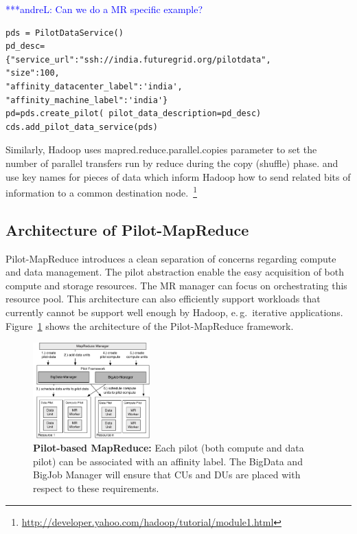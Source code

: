 \documentclass{acm_proc_article-sp}
\newcommand{\alnote}[1]{ {\textcolor{blue} { ***andreL: #1 }}}
\newcommand{\alnote}[1]{}
\newcommand{\pilotmapreduce}{Pilot-MapReduce\xspace}
\begin{document}
\alnote{Can we do a MR specific example?}

\lstset{
language=Python,
frame=single,
captionpos=b,
stringstyle=\ttfamily,
basicstyle=\scriptsize\ttfamily
}
\noindent\begin{minipage}{0.47 \textwidth}
\begin{lstlisting}[caption={\textbf{Pilot Data Creation:} Instantiation of a Pilot Data using Pilot Data Description}, label={lst:pds_creation}]
pds = PilotDataService()
pd_desc=
{"service_url":"ssh://india.futuregrid.org/pilotdata",
"size":100,
"affinity_datacenter_label":'india',
"affinity_machine_label":'india'}
pd=pds.create_pilot( pilot_data_description=pd_desc)
cds.add_pilot_data_service(pds)
\end{lstlisting}
\end{minipage}

Similarly, Hadoop uses mapred.reduce.parallel.copies parameter to set
the number of parallel transfers run by reduce during the
copy (shuffle) phase.  and use key names for pieces of data which
inform Hadoop how to send related bits of information to a common
destination
node.~\footnote{\url{http://developer.yahoo.com/hadoop/tutorial/module1.html}}

\subsection{Architecture of \pilotmapreduce}
\pilotmapreduce introduces a clean separation of concerns regarding compute and data management. The
pilot abstraction enable the easy acquisition of both compute and storage
resources. The MR manager can focus on orchestrating this resource pool. This architecture can also efficiently 
support workloads that currently cannot be support well enough by Hadoop, e.\,g.\ iterative applications. 
Figure~\ref{fig:figures_mapreduce-pilotdata} shows the architecture of the
\pilotmapreduce framework.

\begin{figure}[htbp]
	\centering
	\includegraphics[width=0.4\textwidth]{figures/mapreduce-pilotdata.pdf}
	\caption{\textbf{Pilot-based MapReduce:} Each pilot (both compute and data 
	pilot) can be associated with an affinity label. The BigData and BigJob 
	Manager will ensure that CUs and DUs are placed with respect to these 
	requirements.}
	\label{fig:figures_mapreduce-pilotdata}
\end{figure}
\end{document}
